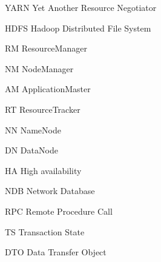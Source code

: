 \begin{basedescript}{\desclabelstyle{\pushlabel}\desclabelwidth{10em}}
\item[YARN] Yet Another Resource Negotiator
  \cite{Vavilapalli:2013:AHY:2523616.2523633}
\item[HDFS] Hadoop Distributed File System \cite{Shvachko:2010:HDF:1913798.1914427}
\item[RM] ResourceManager
\item[NM] NodeManager
\item[AM] ApplicationMaster
\item[RT] ResourceTracker
\item[NN] NameNode
\item[DN] DataNode
\item[HA] High availability
\item[NDB] Network Database
\item[RPC] Remote Procedure Call
\item[TS] Transaction State
\item[DTO] Data Transfer Object
\end{basedescript}